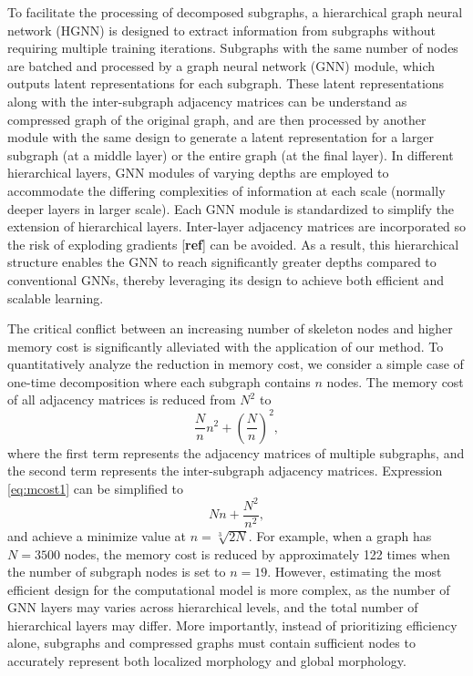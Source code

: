 \documentclass{article}
\begin{document}
To facilitate the processing of decomposed subgraphs, a hierarchical graph neural network (HGNN) is designed to extract information from subgraphs without requiring multiple training iterations. Subgraphs with the same number of nodes are batched and processed by a graph neural network (GNN) module, which outputs latent representations for each subgraph. These latent representations along with the inter-subgraph adjacency matrices can be understand as compressed graph of the original graph, and are then processed by another module with the same design to generate a latent representation for a larger subgraph (at a middle layer) or the entire graph (at the final layer). In different hierarchical layers, GNN modules of varying depths are employed to accommodate the differing complexities of information at each scale (normally deeper layers in larger scale). Each GNN module is standardized to simplify the extension of hierarchical layers. Inter-layer adjacency matrices are incorporated so the risk of exploding gradients [\textbf{ref}] can be avoided. As a result, this hierarchical structure enables the GNN to reach significantly greater depths compared to conventional GNNs, thereby leveraging its design to achieve both efficient and scalable learning.

The critical conflict between an increasing number of skeleton nodes and higher memory cost is significantly alleviated with the application of our method. To quantitatively analyze the reduction in memory cost, we consider a simple case of one-time decomposition where each subgraph contains 
 \(n\) nodes. The memory cost of all adjacency matrices is reduced from \(N^2\) to
\begin{equation}
\label{eq:mcost1}
\frac{N}{n} n^{2} +\left( \frac{N}{n} \right) ^{2},
\end{equation}
where the first term represents the adjacency matrices of multiple subgraphs, and the second term represents the inter-subgraph adjacency matrices. Expression \eqref{eq:mcost1} can be simplified to 
\begin{equation}
\label{eq:mcost1_smp}
N n +\frac{N^{2}}{n^{2}},
\end{equation}
and achieve a minimize value at \(n=\sqrt[3]{2N} \). For example, when a graph has \(N=3500\) nodes, the memory cost is reduced by approximately 122 times when the number of subgraph nodes is set to \(n=19\). However, estimating the most efficient design for the computational model is more complex, as the number of GNN layers may varies across hierarchical levels, and the total number of hierarchical layers may differ. More importantly, instead of prioritizing efficiency alone, subgraphs and compressed graphs must contain sufficient nodes to accurately represent both localized morphology and global morphology.
\end{document}
